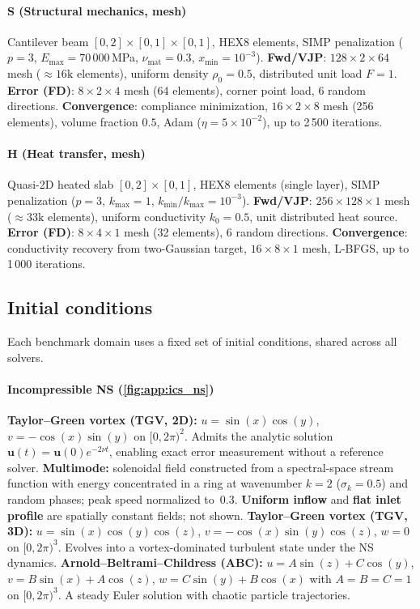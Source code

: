 \documentclass[11pt,a4paper]{article}
\begin{document}
\paragraph{S (Structural mechanics, mesh)}
Cantilever beam $[0,2]\times[0,1]\times[0,1]$, HEX8 elements, SIMP penalization
($p=3$, $E_\text{max}=70\,000$\,MPa, $\nu_\text{mat}=0.3$, $x_\text{min}=10^{-3}$).
\textbf{Fwd/VJP}: $128\times2\times64$ mesh (${\approx}16\text{k}$ elements), uniform
density $\rho_0=0.5$, distributed unit load $F=1$.
\textbf{Error (FD)}: $8\times2\times4$ mesh (64 elements), corner point load,
6 random directions.
\textbf{Convergence}: compliance minimization, $16\times2\times8$ mesh (256 elements),
volume fraction $0.5$, Adam ($\eta=5\times10^{-2}$), up to 2\,500 iterations.

\paragraph{H (Heat transfer, mesh)}
Quasi-2D heated slab $[0,2]\times[0,1]$, HEX8 elements (single layer), SIMP
penalization ($p=3$, $k_\text{max}=1$, $k_\text{min}/k_\text{max}=10^{-3}$).
\textbf{Fwd/VJP}: $256\times128\times1$ mesh (${\approx}33\text{k}$ elements), uniform
conductivity $k_0=0.5$, unit distributed heat source.
\textbf{Error (FD)}: $8\times4\times1$ mesh (32 elements), 6 random directions.
\textbf{Convergence}: conductivity recovery from two-Gaussian target,
$16\times8\times1$ mesh, L-BFGS, up to 1\,000 iterations.

\subsection{Initial conditions}
\label{app:ics}

Each benchmark domain uses a fixed set of initial conditions, shared across
all solvers.

\paragraph{Incompressible NS (\cref{fig:app:ics_ns})}
\textbf{Taylor--Green vortex (TGV, 2D):}
$u = \sin(x)\cos(y)$, $v = -\cos(x)\sin(y)$ on $[0,2\pi)^2$.
Admits the analytic solution $\mathbf{u}(t)=\mathbf{u}(0)e^{-2\nu t}$,
enabling exact error measurement without a reference solver.
\textbf{Multimode:} solenoidal field constructed from a spectral-space
stream function with energy concentrated in a ring at wavenumber $k=2$
($\sigma_k=0.5$) and random phases; peak speed normalized to~0.3.
\textbf{Uniform inflow} and \textbf{flat inlet profile} are spatially
constant fields; not shown.
\textbf{Taylor--Green vortex (TGV, 3D):}
$u = \sin(x)\cos(y)\cos(z)$, $v = -\cos(x)\sin(y)\cos(z)$, $w = 0$
on $[0,2\pi)^3$.
Evolves into a vortex-dominated turbulent state under the NS dynamics.
\textbf{Arnold--Beltrami--Childress (ABC):}
$u = A\sin(z)+C\cos(y)$, $v = B\sin(x)+A\cos(z)$,
$w = C\sin(y)+B\cos(x)$ with $A=B=C=1$ on $[0,2\pi)^3$.
A steady Euler solution with chaotic particle trajectories.
\end{document}
